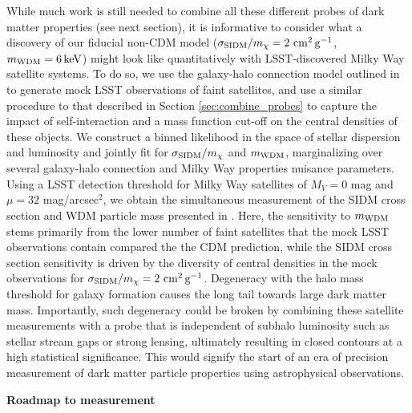 While much work is still needed to combine all these different probes of dark matter properties (see next section), it is informative to consider what a discovery of our fiducial non-CDM model ($\sigma_{\rm SIDM}/m_\chi = 2 \mathrm{\,\mathrm{\,cm}^2\mathrm{\,g}^{-1}}$, $m_{\rm WDM} = 6 \mathrm{\,keV}$) might look like quantitatively with LSST-discovered Milky Way satellite systems. To do so, we use the galaxy-halo connection model outlined in \cite{Nadler:2018} to generate mock LSST observations of faint satellites, and use a similar procedure to that described in Section \ref{sec:combine_probes} to capture the impact of self-interaction and a mass function cut-off on the central densities of these objects. We construct a binned likelihood in the space of stellar dispersion and luminosity and jointly fit for $\sigma_{\rm SIDM}/m_\chi$ and $m_{\rm WDM}$, marginalizing over several galaxy-halo connection and Milky Way properties nuisance parameters. Using a LSST detection threshold for Milky Way satellites of $M_V = 0$ mag and $\mu=32$ mag/arcsec$^2$, we obtain the simultaneous measurement of the SIDM cross section and WDM particle mass presented in . Here, the sensitivity to $m_{\rm WDM}$ stems primarily from the lower number of faint satellites that the mock LSST observations contain compared the the CDM prediction, while the SIDM cross section sensitivity is driven by the diversity of central densities in the mock observations for $\sigma_{\rm SIDM}/m_\chi = 2 \mathrm{\,\mathrm{\,cm}^2\mathrm{\,g}^{-1}}$. Degeneracy with the halo mass threshold for galaxy formation causes the long tail towards large dark matter mass. Importantly, such degeneracy could be broken by combining these satellite measurements with a probe that is independent of subhalo luminosity such as stellar stream gaps or strong lensing, ultimately resulting in closed contours at a high statistical significance. This would signify the start of an era of precision measurement of dark matter particle properties using astrophysical observations.



{\bf Roadmap to measurement}

